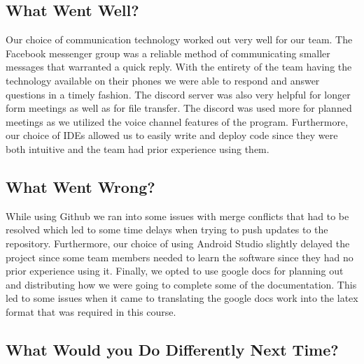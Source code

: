 \documentclass{article}
\begin{document}
\subsection{What Went Well?}

Our choice of communication technology worked out very well for our team. The Facebook messenger group was a reliable method of communicating smaller messages that warranted a quick reply. With the entirety of the team having the technology available on their phones we were able to respond and answer questions in a timely fashion. The discord server was also very helpful for longer form meetings as well as for file transfer. The discord was used more for planned meetings as we utilized the voice channel features of the program. Furthermore, our choice of IDEs allowed us to easily write and deploy code since they were both intuitive and the team had prior experience using them.


\subsection{What Went Wrong?}

While using Github we ran into some issues with merge conflicts that had to be resolved which led to some time delays when trying to push updates to the repository. Furthermore, our choice of using Android Studio slightly delayed the project since some team members needed to learn the software since they had no prior experience using it. Finally, we opted to use google docs for planning out and distributing how we were going to complete some of the documentation. This led to some issues when it came to translating the google docs work into the latex format that was required in this course.


\subsection{What Would you Do Differently Next Time?}
\end{document}
